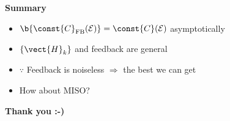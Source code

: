 \documentclass[landscape,dvips,a4]{seminar}
\begin{document}
\begin{slide}
  \begin{center}
    \textbf{\Large Summary}
  \end{center}
\vspace{3mm}
\begin{itemize}
\item
  ${\b{\const{C}_{\textnormal{FB}}(\mathcal{E})}}=\const{C}(\mathcal{E})$
  asymptotically
\item $\{\vect{H}_k\}$ and feedback are general 
\item $\because$ Feedback is noiseless $\Rightarrow$ the best we can get
\item How about MISO?
\end{itemize} 
\end{slide}

\begin{slide}
  \begin{center}
    \textbf{\Large Thank you :-)}
  \end{center}
\end{slide}
\end{document}
